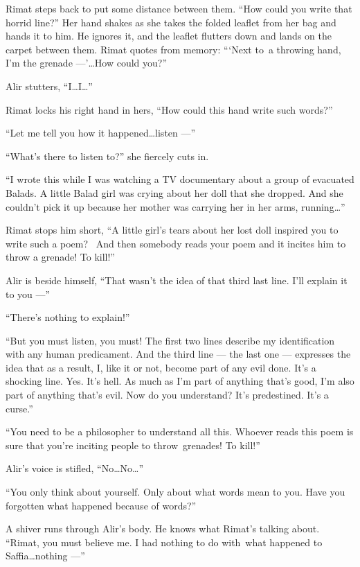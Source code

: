 \documentclass[twoside,11pt,openany]{book}
\begin{document}
Rimat steps back to put some distance between them. ``How could you write that horrid line?''
Her hand shakes as she takes the folded leaflet from her bag and hands it to him. He ignores it, and the leaflet
flutters down and lands on the carpet between them. Rimat quotes from memory:
``{\thinspace}`Next to~a throwing hand,
I'm the grenade ---'{\ldots}How could you?''

Alir stutters, ``I{\ldots}I{\ldots}''

Rimat locks his right hand in hers, ``How could this hand write such words?''

``Let me tell you how it happened{\ldots}listen ---''

``What's there to listen to?'' she fiercely cuts in.

``I wrote this while I was watching a TV documentary about a group of evacuated Balads. A little Balad girl
was crying about her doll that she dropped. And she couldn't pick it up because her mother was carrying her in her
arms, running{\ldots}''

Rimat stops him short, ``A little girl's tears about her lost doll inspired you to write such a poem?~ And
then somebody reads your poem and it incites him to throw a grenade! To kill!''

Alir is beside himself, ``That wasn't the idea of that third last line. I'll explain it to you ---''

``There's nothing to explain!''

``But you must listen, you must! The first two lines describe my identification with any human predicament.
And the third line --- the last one --- expresses the idea that as a result, I, like it or not, become part of any evil
done. It's a shocking line. Yes. It's hell. As much as I'm part of anything that's good, I'm also part of anything
that's evil. Now do you understand? It's predestined. It's a curse.''

``You need to be a philosopher to understand all this. Whoever reads this poem is sure that you're inciting
people to throw~grenades! To kill!''

Alir's voice is stifled, ``No{\ldots}No{\ldots}''

``You only think about yourself. Only about what words mean to you. Have you forgotten what happened
because of words?''

A shiver runs through Alir's body. He knows what Rimat's talking about. ``Rimat, you must believe me. I
had nothing to do with~what happened to Saffia{\ldots}nothing ---''
\end{document}
